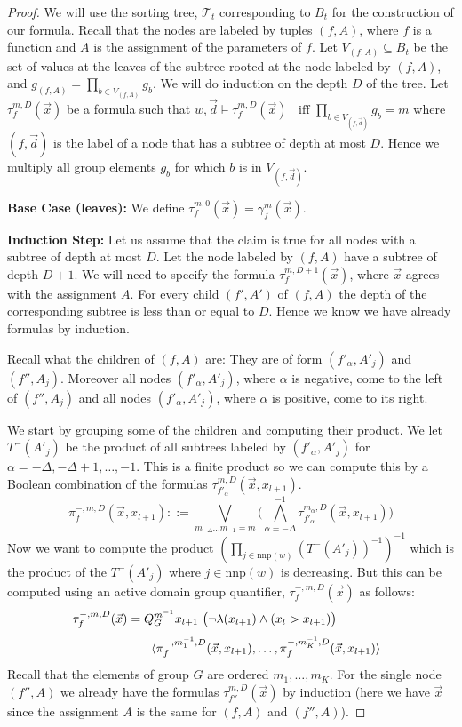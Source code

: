 \documentclass[envcountsame]{llncs}
\newcommand{\mon}[2]{Q_{#1}^{#2}}
\newcommand{\nnp}{\mathrm{nnp}}
\newcommand{\defs}{::=}
\begin{document}
\begin{proof}
We will use the sorting tree, $\mathcal{T}_t$ corresponding to $B_t$ for the construction of our formula. 
Recall that the nodes are labeled by tuples $(f,A)$, where $f$ is a function and $A$ is the assignment of the parameters of $f$. Let $V_{(f,A)}\subseteq B_t$ be the set of values at the leaves of the subtree rooted at the node labeled by $(f,A)$, and $g_{(f,A)}=\prod_{b\in V_{(f,A)}} g_b$.
We will do induction on the depth $D$ of the tree.
Let $\tau^{m,D}_{f}(\vec x)$ be a formula such that 
$w,\vec d \models \tau^{m,D}_{f}(\vec x)~~\text{$~~$iff }\prod_{b\in V_{(f,\vec d)}} g_b=m$ where $(f, \vec d)$ is the label of a node that has a subtree of depth at most $D$.
Hence we multiply all group elements $g_b$ for which $b$ is in $V_{(f,\vec d)}$.

{\bf Base Case (leaves):} 
We define $\tau^{m,0}_{f}(\vec x)=\gamma_f^m(\vec x)$.

{\bf Induction Step:} Let us assume that the claim is true for all nodes with a subtree of depth at most $D$.
Let the node labeled by $(f,A)$ have a subtree of depth $D+1$. We will need to specify the formula $\tau^{m,D+1}_{f}(\vec x)$, where $\vec x$ agrees with the assignment $A$.
For every child $(f',A')$ of $(f,A)$ the depth of the corresponding subtree is less than or equal to $D$. Hence we know we have already formulas by induction.

Recall what the children of $(f,A)$ are: They are of form $(f'_{\alpha},A'_j)$ and $(f'',A_j)$. Moreover all nodes
$(f'_{\alpha},A'_j)$, where $\alpha$ is
negative, come to the left of $(f'',A_j)$ and all nodes $(f'_{\alpha},A'_j)$, where $\alpha$ is positive, come to its right.

We start by grouping some of the children and computing their product.
We let $T^-(A'_j)$ be the product of all subtrees labeled by $(f'_{\alpha},A'_j)$ for $\alpha=-\Delta,-\Delta+1,\dots,-1$.
This is a finite product so we can compute this by a Boolean combination of the formulas $\tau^{m,D}_{f'_{\alpha}}(\vec x,x_{l+1})$.
$$\pi^{-,m,D}_f(\vec x,x_{l+1}) \defs \bigvee_{m_{-\Delta}\dots m_{-1}=m} \bigg(\bigwedge_{\alpha=-\Delta}^{-1} \tau^{m_{\alpha},D}_{f'_{\alpha}}(\vec x,x_{l+1})\bigg)$$
Now we want to compute the product $\left(\prod_{j\in\nnp(w)} (T^-(A'_j))^{-1}\right)^{-1}$ which is the product of the $T^-(A'_j)$ where $j\in\nnp(w)$ is decreasing.
But this can be computed using an active domain group quantifier, $\tau_f^{-,m,D}(\vec x)$ as follows:
$$\tau_f^{-,m,D}(\vec x) = \mon{G}{m^{-1}} x_{l+1} ~\big(\neg \lambda(x_{l+1}) \wedge (x_l > x_{l+1})\big) \hspace*{1.5cm}$$
$$\hspace*{2cm}\langle \pi_f^{-,m_1^{-1},D}(\vec x,x_{l+1}),\dots, \pi_f^{-,m_K^{-1},D}(\vec x,x_{l+1})\rangle$$ 
Recall that the elements of group $G$ are ordered $m_1,\ldots,m_K$.
For the single node $(f'',A)$ we already have the formulas $\tau^{m,D}_{f''}(\vec x)$ by induction (here we have $\vec x$ since the assignment $A$ is the same for $(f,A)$ and $(f'',A)$).


\end{proof}
\end{document}
